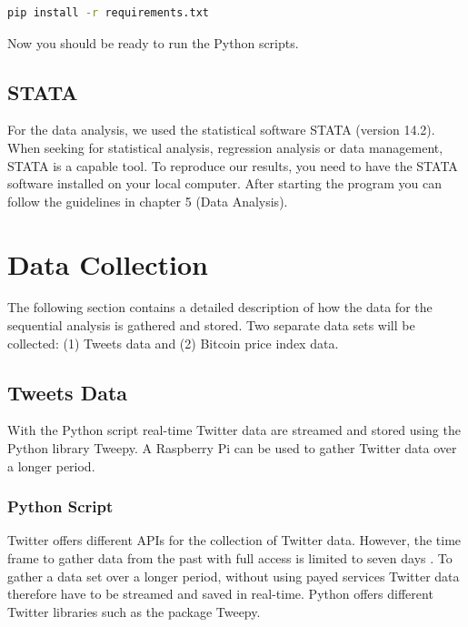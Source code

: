 \documentclass[a4paper,12pt]{article}
\begin{document}
\begin{spacing}{1.2}
\begin{lstlisting}[language=bash]
    pip install -r requirements.txt
\end{lstlisting}
Now you should be ready to run the Python scripts.

\subsection{STATA}
For the data analysis, we used the statistical software STATA (version 14.2). When seeking for statistical analysis, regression analysis or data management, STATA is a capable tool. To reproduce our results, you need to have the STATA software installed on your local computer. After starting the program you can follow the guidelines in chapter 5 (Data Analysis). 

\clearpage

\section{Data Collection}
The following section contains a detailed description of how the data for the sequential analysis is gathered and stored. Two separate data sets will be collected: (1) Tweets data and (2) Bitcoin price index data.
\subsection{Tweets Data}
With the Python script real-time Twitter data are streamed and stored using the Python library Tweepy. A Raspberry Pi can be used to gather Twitter data over a longer period.
\subsubsection{Python Script}
Twitter offers different APIs for the collection of Twitter data. However, the time frame to gather data from the past with full access is limited to seven days \parencite{twitterinc2017a}. To gather a data set over a longer period, without using payed services Twitter data therefore have to be streamed and saved in real-time. Python offers different Twitter libraries such as the package Tweepy.


\end{spacing}
\end{document}
